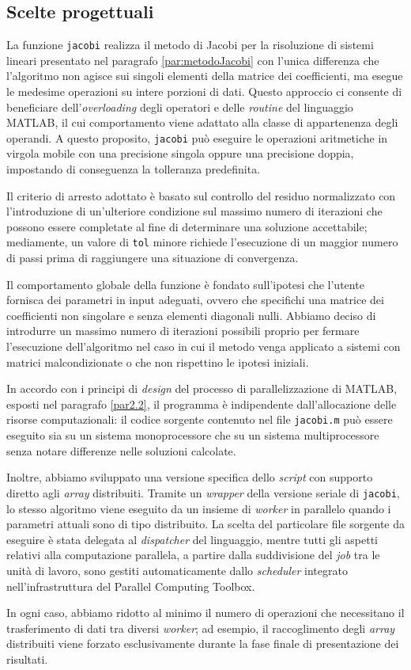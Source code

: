 \subsection{Scelte progettuali}
La funzione \lstinline{jacobi} realizza il metodo di Jacobi per la risoluzione di sistemi lineari presentato nel paragrafo \ref{par:metodoJacobi} con l'unica differenza che l'algoritmo non agisce sui 
singoli elementi della matrice dei coefficienti, ma esegue le medesime operazioni su intere porzioni di dati.\newline
Questo approccio ci consente di beneficiare dell'\textit{overloading} degli operatori e delle \textit{routine} del linguaggio MATLAB, il cui comportamento viene adattato
alla classe di appartenenza degli operandi.\newline
A questo proposito, \lstinline{jacobi} pu\`o eseguire le operazioni aritmetiche in virgola mobile con una precisione singola oppure una precisione 
doppia, impostando di conseguenza la tolleranza predefinita.

Il criterio di arresto adottato \`e basato sul controllo del residuo normalizzato con l'introduzione di un'ulteriore condizione sul massimo numero di 
iterazioni che possono essere completate al fine di determinare una soluzione accettabile; mediamente, un valore di \lstinline{tol} minore richiede 
l'esecuzione di un maggior numero di passi prima di raggiungere una situazione di convergenza.

Il comportamento globale della funzione \`e fondato sull'ipotesi che l'utente fornisca dei parametri in input adeguati, ovvero che specifichi una matrice dei 
coefficienti non singolare e senza elementi diagonali nulli.\newline
Abbiamo deciso di introdurre un massimo numero di iterazioni possibili proprio per fermare l'esecuzione dell'algoritmo nel caso in cui il metodo venga 
applicato a sistemi con matrici malcondizionate o che non rispettino le ipotesi iniziali.

In accordo con i principi di \textit{design} del processo di parallelizzazione di MATLAB, esposti nel paragrafo \ref{par2.2}, il programma \`e 
indipendente dall'allocazione delle risorse computazionali: il codice sorgente contenuto nel file \lstinline{jacobi.m} pu\`o essere eseguito sia su un 
sistema monoprocessore che su un sistema multiprocessore senza notare differenze nelle soluzioni calcolate.

Inoltre, abbiamo sviluppato una versione specifica dello \textit{script} con supporto diretto agli \textit{array} distribuiti.\newline
Tramite un \textit{wrapper} della versione seriale di \lstinline{jacobi}, lo stesso algoritmo viene eseguito da un insieme di \textit{worker} in parallelo 
quando i parametri attuali sono di tipo distribuito.\newline
La scelta del particolare file sorgente da eseguire \`e stata delegata al \textit{dispatcher} del linguaggio, 
mentre tutti gli aspetti relativi alla computazione parallela, a partire dalla suddivisione del \textit{job} tra le unit\`a di lavoro, sono 
gestiti automaticamente dallo \textit{scheduler} integrato nell'infrastruttura del Parallel Computing Toolbox.

In ogni caso, abbiamo ridotto al minimo il numero di operazioni che necessitano il trasferimento di dati tra diversi \textit{worker}; ad esempio, 
il raccoglimento degli \textit{array} distribuiti viene forzato esclusivamente durante la fase finale di presentazione dei risultati.

